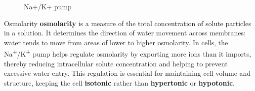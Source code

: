 \documentclass[../main.tex]{subfiles}
\begin{document}
\begin{figure}[H]
	\centering
	\caption{Na+/K+ pump}
\end{figure} 

\begin{RemarkWithTitel}{Osmolarity}
	\textbf{\gls{osmolarity}} is a measure of the total concentration of solute particles in a solution. It determines the direction of water movement across membranes: water tends to move from areas of lower to higher osmolarity. In cells, the Na\textsuperscript{+}/K\textsuperscript{+} pump helps regulate osmolarity by exporting more ions than it imports, thereby reducing intracellular solute concentration and helping to prevent excessive water entry. This regulation is essential for maintaining cell volume and structure, keeping the cell \textbf{\gls{isotonic}} rather than \textbf{\gls{hypertonic}} or \textbf{\gls{hypotonic}}.
\end{RemarkWithTitel}
\end{document}
